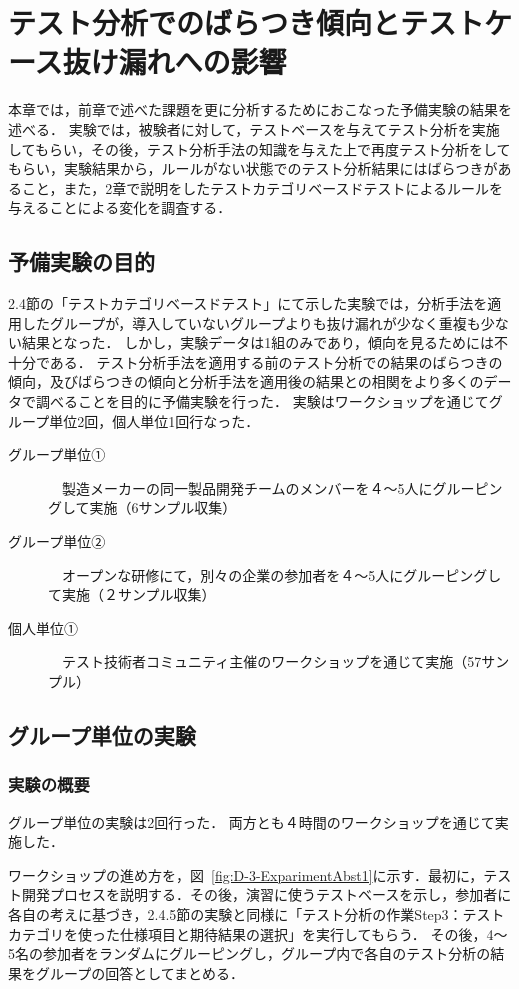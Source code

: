 \chapter{テスト分析でのばらつき傾向とテストケース抜け漏れへの影響}\label{chap:3}
本章では，前章で述べた課題を更に分析するためにおこなった予備実験の結果を述べる．
実験では，被験者に対して，テストベースを与えてテスト分析を実施してもらい，その後，テスト分析手法の知識を与えた上で再度テスト分析をしてもらい，実験結果から，ルールがない状態でのテスト分析結果にはばらつきがあること，また，2章で説明をしたテストカテゴリベースドテストによるルールを与えることによる変化を調査する．

\newpage
\section{予備実験の目的} \label{sec:3-1}
2.4節の「テストカテゴリベースドテスト」にて示した実験では，分析手法を適用したグループが，導入していないグループよりも抜け漏れが少なく重複も少ない結果となった．
しかし，実験データは1組のみであり，傾向を見るためには不十分である．
テスト分析手法を適用する前のテスト分析での結果のばらつきの傾向，及びばらつきの傾向と分析手法を適用後の結果との相関をより多くのデータで調べることを目的に予備実験を行った．
実験はワークショップを通じてグループ単位2回，個人単位1回行なった．
\begin{description}
  \item[グループ単位①]　製造メーカーの同一製品開発チームのメンバーを４〜5人にグルーピングして実施（6サンプル収集）
  \item[グループ単位②]　オープンな研修にて，別々の企業の参加者を４〜5人にグルーピングして実施（２サンプル収集）
  \item[個人単位①]　テスト技術者コミュニティ主催のワークショップを通じて実施（57サンプル）
\end{description}

\newpage
\section{グループ単位の実験}
\subsection{実験の概要}
グループ単位の実験は2回行った．
両方とも４時間のワークショップを通じて実施した．

ワークショップの進め方を，図~\ref{fig:D-3-ExparimentAbst1}に示す．最初に，テスト開発プロセスを説明する．その後，演習に使うテストベースを示し，参加者に各自の考えに基づき，2.4.5節の実験と同様に「テスト分析の作業Step3：テストカテゴリを使った仕様項目と期待結果の選択」を実行してもらう．
その後，4〜5名の参加者をランダムにグルーピングし，グループ内で各自のテスト分析の結果をグループの回答としてまとめる．


